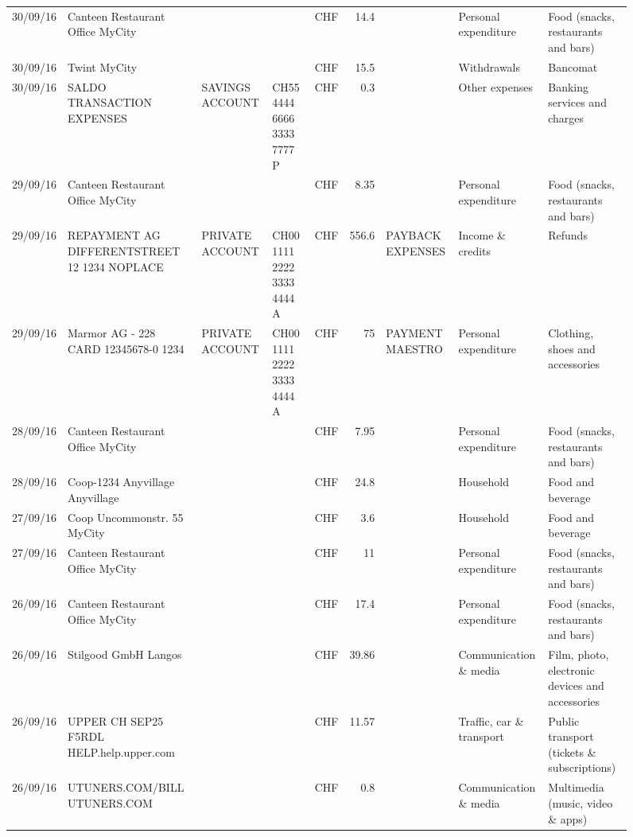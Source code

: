 \begin{landscape}
\begin{sidewaysfigure}
\begin{table}[h]
\begin{center}
\begin{tabular}{rllllrlll}
		30/09/16 & Canteen Restaurant Office      MyCity &       &       & CHF   & 14.4  &       & Personal expenditure & Food (snacks, restaurants and bars) \\
		30/09/16 & Twint               MyCity &       &       & CHF   & 15.5  &       & Withdrawals & Bancomat \\
		30/09/16 & SALDO TRANSACTION EXPENSES & SAVINGS ACCOUNT & CH55 4444 6666 3333 7777 P & CHF   & 0.3   &       & Other expenses & Banking services and charges \\
		29/09/16 & Canteen Restaurant Office      MyCity &       &       & CHF   & 8.35  &       & Personal expenditure & Food (snacks, restaurants and bars) \\
		29/09/16 & REPAYMENT AG DIFFERENTSTREET 12 1234 NOPLACE & PRIVATE ACCOUNT & CH00 1111 2222 3333 4444 A & CHF   & 556.6 & PAYBACK EXPENSES & Income \& credits & Refunds \\
		29/09/16 & Marmor AG - 228 CARD 12345678-0 1234 & PRIVATE ACCOUNT & CH00 1111 2222 3333 4444 A & CHF   & 75    & PAYMENT MAESTRO & Personal expenditure & Clothing, shoes and accessories \\
		28/09/16 & Canteen Restaurant Office      MyCity &       &       & CHF   & 7.95  &       & Personal expenditure & Food (snacks, restaurants and bars) \\
		28/09/16 & Coop-1234 Anyvillage    Anyvillage &       &       & CHF   & 24.8  &       & Household & Food and beverage \\
		27/09/16 & Coop Uncommonstr. 55   MyCity &       &       & CHF   & 3.6   &       & Household & Food and beverage \\
		27/09/16 & Canteen Restaurant Office      MyCity &       &       & CHF   & 11    &       & Personal expenditure & Food (snacks, restaurants and bars) \\
		26/09/16 & Canteen Restaurant Office      MyCity &       &       & CHF   & 17.4  &       & Personal expenditure & Food (snacks, restaurants and bars) \\
		26/09/16 & Stilgood GmbH             Langos &       &       & CHF   & 39.86 &       & Communication \& media & Film, photo, electronic devices and accessories \\
		26/09/16 & UPPER CH SEP25 F5RDL HELP.help.upper.com &       &       & CHF   & 11.57 &       & Traffic, car \& transport & Public transport (tickets \& subscriptions) \\
		26/09/16 & UTUNERS.COM/BILL          UTUNERS.COM &       &       & CHF   & 0.8   &       & Communication \& media & Multimedia (music, video \& apps) \\

\end{tabular}
\end{center}
\end{table}
\end{sidewaysfigure}
\end{landscape}
